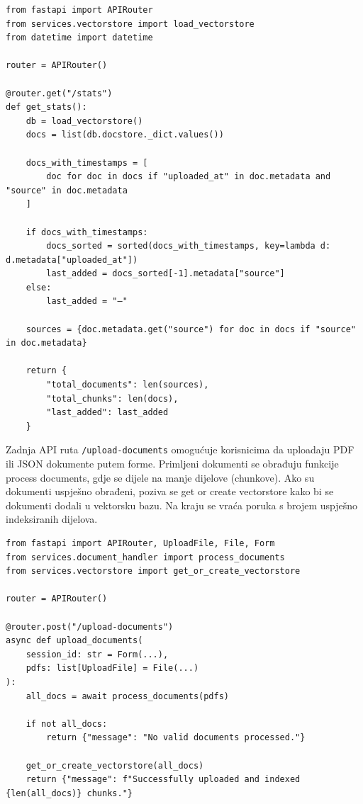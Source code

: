 \documentclass[]{foi}
\begin{document}
\begin{longlisting}
\begin{verbatim}
from fastapi import APIRouter
from services.vectorstore import load_vectorstore
from datetime import datetime

router = APIRouter()

@router.get("/stats")
def get_stats():
    db = load_vectorstore()
    docs = list(db.docstore._dict.values())

    docs_with_timestamps = [
        doc for doc in docs if "uploaded_at" in doc.metadata and "source" in doc.metadata
    ]

    if docs_with_timestamps:
        docs_sorted = sorted(docs_with_timestamps, key=lambda d: d.metadata["uploaded_at"])
        last_added = docs_sorted[-1].metadata["source"]
    else:
        last_added = "—"

    sources = {doc.metadata.get("source") for doc in docs if "source" in doc.metadata}

    return {
        "total_documents": len(sources),
        "total_chunks": len(docs),
        "last_added": last_added
    }
\end{verbatim}
\caption{Stats.py}
\label{lst:stats}
\end{longlisting}

Zadnja API ruta \verb|/upload-documents| omogućuje korisnicima da uploadaju PDF ili JSON dokumente putem forme. Primljeni dokumenti se obrađuju funkcije process documents,
gdje se dijele na manje dijelove (chunkove). Ako su dokumenti uspješno obrađeni, poziva se get or create vectorstore kako bi se dokumenti
dodali u vektorsku bazu. Na kraju se vraća poruka s brojem uspješno indeksiranih dijelova.

\begin{longlisting}
\begin{verbatim}
from fastapi import APIRouter, UploadFile, File, Form
from services.document_handler import process_documents
from services.vectorstore import get_or_create_vectorstore

router = APIRouter()

@router.post("/upload-documents")
async def upload_documents(
    session_id: str = Form(...),
    pdfs: list[UploadFile] = File(...)
):
    all_docs = await process_documents(pdfs)

    if not all_docs:
        return {"message": "No valid documents processed."}

    get_or_create_vectorstore(all_docs)
    return {"message": f"Successfully uploaded and indexed {len(all_docs)} chunks."}
\end{verbatim}
\caption{Upload.py}
\label{lst:upload}
\end{longlisting}
\newpage
\end{document}
